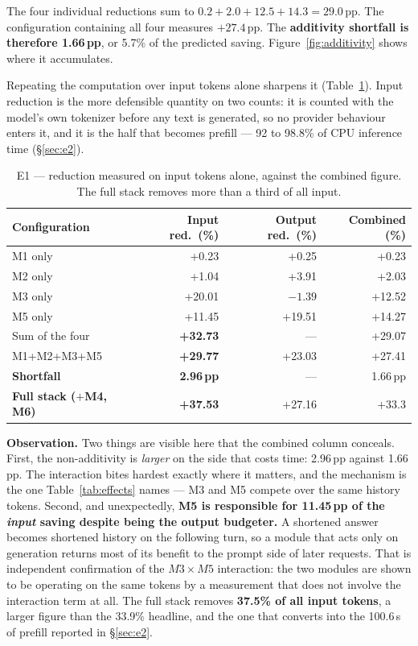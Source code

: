 \documentclass[11pt,a4paper]{article}
\newcommand{\obs}[1]{%
  \par\vspace{2pt}
  \noindent\begin{tcolorbox}[colback=soft,colframe=accent,boxrule=0pt,
    leftrule=2.2pt,arc=0pt,left=7pt,right=5pt,top=4pt,bottom=4pt,breakable]
  \small\textbf{Observation.} #1
  \end{tcolorbox}\par\vspace{2pt}}
\begin{document}
The four individual reductions sum to $0.2 + 2.0 + 12.5 + 14.3 = 29.0$\,pp. The
configuration containing all four measures $+27.4$\,pp. The
\textbf{additivity shortfall is therefore 1.66\,pp}, or 5.7\% of the predicted
saving. Figure~\ref{fig:additivity} shows where it accumulates.

Repeating the computation over input tokens alone sharpens it
(Table~\ref{tab:inputside}). Input reduction is the more defensible quantity on
two counts: it is counted with the model's own tokenizer before any text is
generated, so no provider behaviour enters it, and it is the half that becomes
prefill --- 92 to 98.8\% of CPU inference time (§\ref{sec:e2}).

\begin{table}[htbp]
\centering
\caption{E1 --- reduction measured on input tokens alone, against the combined
figure. The full stack removes more than a third of all input.}
\label{tab:inputside}
\footnotesize
\begin{tabular}{@{}l rrr@{}}
\toprule
\textbf{Configuration} & \textbf{Input red.\ (\%)} &
\textbf{Output red.\ (\%)} & \textbf{Combined (\%)} \\
\midrule
M1 only  & \phantom{0}+0.23 & \phantom{0}+0.25 & \phantom{0}+0.23 \\
M2 only  & \phantom{0}+1.04 & \phantom{0}+3.91 & \phantom{0}+2.03 \\
M3 only  & +20.01 & $-1.39$ & +12.52 \\
M5 only  & +11.45 & +19.51 & +14.27 \\
\midrule
Sum of the four   & \textbf{+32.73} & --- & +29.07 \\
M1+M2+M3+M5       & \textbf{+29.77} & +23.03 & +27.41 \\
\textbf{Shortfall} & \textbf{2.96\,pp} & --- & 1.66\,pp \\
\midrule
\textbf{Full stack ($+$M4, M6)} & \textbf{+37.53} & +27.16 & +33.3 \\
\bottomrule
\end{tabular}
\end{table}

\obs{Two things are visible here that the combined column conceals. First, the
non-additivity is \emph{larger} on the side that costs time: 2.96\,pp against
1.66\,pp. The interaction bites hardest exactly where it matters, and the
mechanism is the one Table~\ref{tab:effects} names --- M3 and M5 compete over the
same history tokens. Second, and unexpectedly, \textbf{M5 is responsible for
11.45\,pp of the \emph{input} saving despite being the output budgeter.} A
shortened answer becomes shortened history on the following turn, so a module
that acts only on generation returns most of its benefit to the prompt side of
later requests. That is independent confirmation of the $M3\times M5$
interaction: the two modules are shown to be operating on the same tokens by a
measurement that does not involve the interaction term at all. The full stack
removes \textbf{37.5\% of all input tokens}, a larger figure than the 33.9\%
headline, and the one that converts into the 100.6\,s of prefill reported in
§\ref{sec:e2}.}
\end{document}
